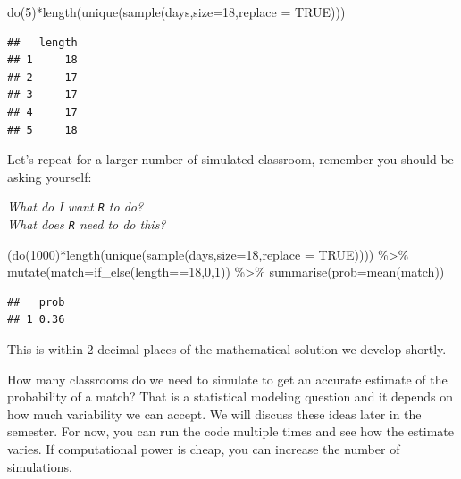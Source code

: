 \documentclass[
]{book}
\newenvironment{Shaded}{\begin{snugshade}}{\end{snugshade}}
\newcommand{\AttributeTok}[1]{\textcolor[rgb]{0.77,0.63,0.00}{#1}}
\newcommand{\ConstantTok}[1]{\textcolor[rgb]{0.00,0.00,0.00}{#1}}
\newcommand{\DecValTok}[1]{\textcolor[rgb]{0.00,0.00,0.81}{#1}}
\newcommand{\FunctionTok}[1]{\textcolor[rgb]{0.00,0.00,0.00}{#1}}
\newcommand{\NormalTok}[1]{#1}
\newcommand{\SpecialCharTok}[1]{\textcolor[rgb]{0.00,0.00,0.00}{#1}}
\begin{document}
\begin{Shaded}
\begin{Highlighting}[]
\FunctionTok{do}\NormalTok{(}\DecValTok{5}\NormalTok{)}\SpecialCharTok{*}\FunctionTok{length}\NormalTok{(}\FunctionTok{unique}\NormalTok{(}\FunctionTok{sample}\NormalTok{(days,}\AttributeTok{size=}\DecValTok{18}\NormalTok{,}\AttributeTok{replace =} \ConstantTok{TRUE}\NormalTok{)))}
\end{Highlighting}
\end{Shaded}

\begin{verbatim}
##   length
## 1     18
## 2     17
## 3     17
## 4     17
## 5     18
\end{verbatim}

Let's repeat for a larger number of simulated classroom, remember you should be asking yourself:

\emph{What do I want \texttt{R} to do?}\\
\emph{What does \texttt{R} need to do this?}

\begin{Shaded}
\begin{Highlighting}[]
\NormalTok{(}\FunctionTok{do}\NormalTok{(}\DecValTok{1000}\NormalTok{)}\SpecialCharTok{*}\FunctionTok{length}\NormalTok{(}\FunctionTok{unique}\NormalTok{(}\FunctionTok{sample}\NormalTok{(days,}\AttributeTok{size=}\DecValTok{18}\NormalTok{,}\AttributeTok{replace =} \ConstantTok{TRUE}\NormalTok{)))) }\SpecialCharTok{\%\textgreater{}\%}
  \FunctionTok{mutate}\NormalTok{(}\AttributeTok{match=}\FunctionTok{if\_else}\NormalTok{(length}\SpecialCharTok{==}\DecValTok{18}\NormalTok{,}\DecValTok{0}\NormalTok{,}\DecValTok{1}\NormalTok{)) }\SpecialCharTok{\%\textgreater{}\%}
  \FunctionTok{summarise}\NormalTok{(}\AttributeTok{prob=}\FunctionTok{mean}\NormalTok{(match))}
\end{Highlighting}
\end{Shaded}

\begin{verbatim}
##   prob
## 1 0.36
\end{verbatim}

This is within 2 decimal places of the mathematical solution we develop shortly.

How many classrooms do we need to simulate to get an accurate estimate of the probability of a match? That is a statistical modeling question and it depends on how much variability we can accept. We will discuss these ideas later in the semester. For now, you can run the code multiple times and see how the estimate varies. If computational power is cheap, you can increase the number of simulations.
\end{document}
